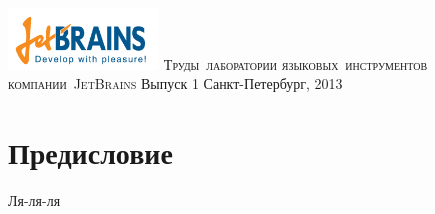 \documentclass[runningheads]{jblab}
\begin{document}
\newcommand{\issue}[0]{1}
\sloppy

\begin{titlepage}

\centering

\includegraphics[width=4cm]{JBLogoWhite.png}
\vskip 2cm
\mbox{\Large{\textsc{Труды лаборатории}}}
\vskip 0.5cm
\mbox{\Large{\textsc{языковых инструментов}}}
\vskip 0.5cm
\mbox{\Large{\textsc{компании JetBrains}}}
\vskip 2cm
\large{Выпуск \issue}
\vskip 6cm
\large{Санкт-Петербург, 2013}
\end{titlepage}

\chapter*{Предисловие}

Ля-ля-ля

\tableofcontents














\end{document}
